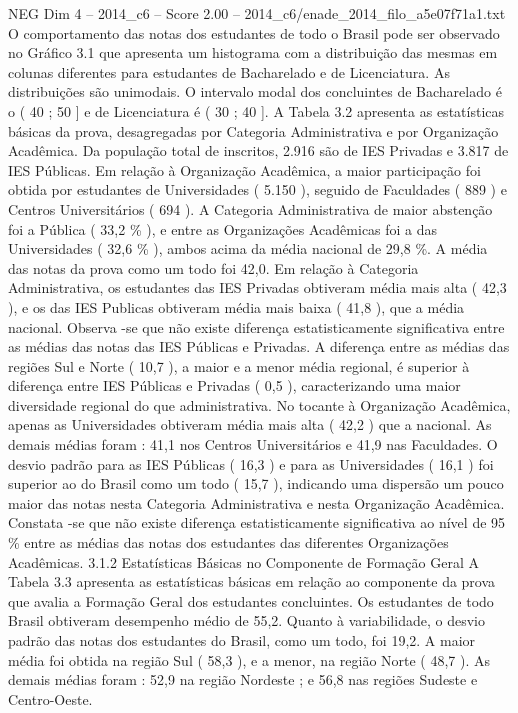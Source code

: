 \begin{textsample}{NEG Dim 4 – 2014\_c6 – Score 2.00 – 2014\_c6/enade\_2014\_filo\_a5e07f71a1.txt}
O comportamento das notas dos estudantes de todo o Brasil pode ser observado no Gráfico 3.1 que apresenta um histograma com a distribuição das mesmas em colunas diferentes para estudantes de Bacharelado e de Licenciatura.
As distribuições são unimodais.
O intervalo modal dos concluintes de Bacharelado é o ( 40 ; 50 ] e de Licenciatura é ( 30 ; 40 ].
A Tabela 3.2 apresenta as estatísticas básicas da prova, desagregadas por Categoria Administrativa e por Organização Acadêmica.
Da população total de inscritos, 2.916 são de IES Privadas e 3.817 de IES Públicas.
Em relação à Organização Acadêmica, a maior participação foi obtida por estudantes de Universidades ( 5.150 ), seguido de Faculdades ( 889 ) e Centros Universitários ( 694 ).
A Categoria Administrativa de maior abstenção foi a Pública ( 33,2 \% ), e entre as Organizações Acadêmicas foi a das Universidades ( 32,6 \% ), ambos acima da média nacional de 29,8 \%.
A média das notas da prova como um todo foi 42,0.
Em relação à Categoria Administrativa, os estudantes das IES Privadas obtiveram média mais alta ( 42,3 ), e os das IES Publicas obtiveram média mais baixa ( 41,8 ), que a média nacional.
Observa -se que não existe diferença estatisticamente significativa entre as médias das notas das IES Públicas e Privadas.
A diferença entre as médias das regiões Sul e Norte ( 10,7 ), a maior e a menor média regional, é superior à diferença entre IES Públicas e Privadas ( 0,5 ), caracterizando uma maior diversidade regional do que administrativa.
No tocante à Organização Acadêmica, apenas as Universidades obtiveram média mais alta ( 42,2 ) que a nacional.
As demais médias foram : 41,1 nos Centros Universitários e 41,9 nas Faculdades.
O desvio padrão para as IES Públicas ( 16,3 ) e para as Universidades ( 16,1 ) foi superior ao do Brasil como um todo ( 15,7 ), indicando uma dispersão um pouco maior das notas nesta Categoria Administrativa e nesta Organização Acadêmica.
Constata -se que não existe diferença estatisticamente significativa ao nível de 95 \% entre as médias das notas dos estudantes das diferentes Organizações Acadêmicas. 3.1.2 Estatísticas Básicas no Componente de Formação Geral A Tabela 3.3 apresenta as estatísticas básicas em relação ao componente da prova que avalia a Formação Geral dos estudantes concluintes.
Os estudantes de todo Brasil obtiveram desempenho médio de 55,2.
Quanto à variabilidade, o desvio padrão das notas dos estudantes do Brasil, como um todo, foi 19,2.
A maior média foi obtida na região Sul ( 58,3 ), e a menor, na região Norte ( 48,7 ).
As demais médias foram : 52,9 na região Nordeste ; e 56,8 nas regiões Sudeste e Centro-Oeste.

\end{textsample}
